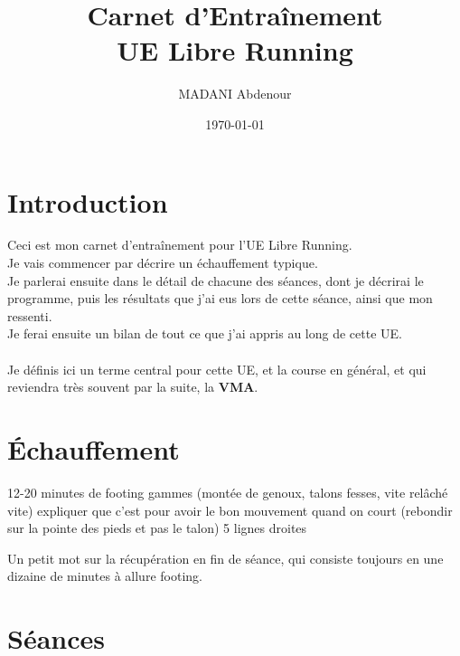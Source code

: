 \documentclass{article}
\title{Carnet d'Entraînement\\
UE Libre Running}%
\author{MADANI Abdenour}%
\date{\today}%
\begin{document}
%
\normalsize%
\maketitle%
\tableofcontents%
\newpage%

\maketitle

\section{Introduction}
    Ceci est mon carnet d'entraînement pour l'UE Libre Running.\\
    Je vais commencer par décrire un échauffement typique.\\
    Je parlerai ensuite dans le détail de chacune des séances, dont je décrirai le programme, puis les résultats que j'ai eus lors de cette séance, ainsi que mon ressenti.\\
    Je ferai ensuite un bilan de tout ce que j'ai appris au long de cette UE.\\\\
    Je définis ici un terme central pour cette UE, et la course en général, et qui reviendra très souvent par la suite, la \textbf{VMA}.

\section{Échauffement}
    12-20 minutes de footing
    gammes (montée de genoux, talons fesses, vite relâché vite)
    expliquer que c'est pour avoir le bon mouvement quand on court
    (rebondir sur la pointe des pieds et pas le talon)
    5 lignes droites
    
    Un petit mot sur la récupération en fin de séance, qui consiste toujours en une dizaine de minutes à allure footing.

\section{Séances}
\end{document}
